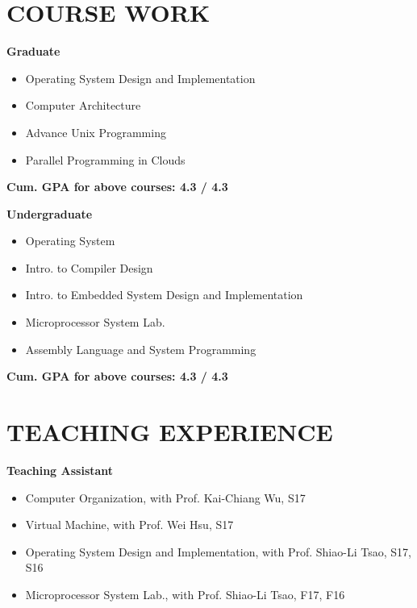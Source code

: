 \documentclass[margin, 9pt]{res} %
\begin{document}
\begin{resume}
\section{COURSE WORK}
{\large\textbf{Graduate}}\\
\vspace*{-10pt}
\begin{itemize}[leftmargin=*] \itemsep -3pt
\vspace*{-5pt}
\item Operating System Design and Implementation
\item Computer Architecture
\item Advance Unix Programming
\item Parallel Programming in Clouds
\end{itemize}
\textbf{Cum. GPA for above courses: 4.3 / 4.3 }

\medskip
{\large\textbf{Undergraduate}}\\
\vspace*{-10pt}
\begin{itemize}[leftmargin=*] \itemsep -3pt
\vspace*{-5pt}
\item Operating System
\item Intro. to Compiler Design
\item Intro. to Embedded System Design and Implementation
\item Microprocessor System Lab.
\item Assembly Language and System Programming
\end{itemize}
\textbf{Cum. GPA for above courses: 4.3 / 4.3 }

\section{TEACHING EXPERIENCE}
{\large\textbf{Teaching Assistant}}\\
\vspace*{-10pt}
\begin{itemize}[leftmargin=*] \itemsep -3pt
\vspace*{-5pt}
\item Computer Organization, with Prof. Kai-Chiang Wu, S17
\item Virtual Machine, with Prof. Wei Hsu, S17
\item Operating System Design and Implementation, with Prof. Shiao-Li Tsao, S17, S16
\item Microprocessor System Lab., with Prof. Shiao-Li Tsao, F17, F16
\end{itemize}


\end{resume}
\end{document}
